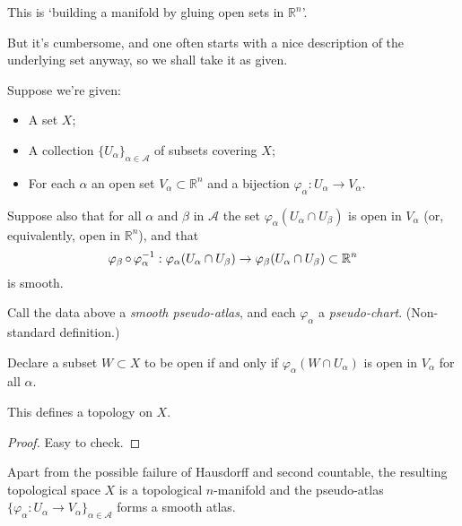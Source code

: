 \documentclass[a4paper,11pt]{article}
\begin{document}
	This is `building a manifold by gluing open sets in $\mathbb{R}^n$'.

	But it's cumbersome, and one often starts with a nice description of the underlying set anyway, so we shall take it as given.

	Suppose we're given:
	\begin{itemize}
		\item A set $X$;
		\item A collection $\{U_\alpha\}_{\alpha\in \mathcal{A}}$ of subsets covering $X$;
		\item For each $\alpha$ an open set $V_\alpha \subset \mathbb{R}^n$ and a bijection $\varphi_\alpha : U_\alpha \to V_\alpha$.
	\end{itemize}
	Suppose also that for all $\alpha$ and $\beta$ in $\mathcal{A}$ the set $\varphi_\alpha(U_\alpha \cap U_\beta)$ is open in $V_\alpha$ (or, equivalently, open in $\mathbb{R}^n$), and that
	\[
		\varphi_\beta \operatorname{\circ} \varphi_\alpha^{-1} : \varphi_\alpha(U_\alpha \cap U_\beta) \to \varphi_\beta (U_\alpha \cap U_\beta) \subset \mathbb{R}^n
	\]
	is smooth.

	\begin{defi}
		Call the data above a \emph{smooth pseudo-atlas}, and each $\varphi_\alpha$ a \emph{pseudo-chart}. (Non-standard definition.)
	\end{defi}

	Declare a subset $W \subset X$ to be open if and only if $\varphi_\alpha(W\cap U_\alpha)$ is open in $V_\alpha$ for all $\alpha$.

	\begin{lem}
		This defines a topology on $X$.
	\end{lem}

	\begin{proof}
		Easy to check.
	\end{proof}

	\begin{prop}
		Apart from the possible failure of Hausdorff and second countable, the resulting topological space $X$ is a topological $n$-manifold and the pseudo-atlas $\{\varphi_\alpha : U_\alpha \to V_\alpha\}_{\alpha\in \mathcal{A}}$ forms a smooth atlas.
	\end{prop}
\end{document}
